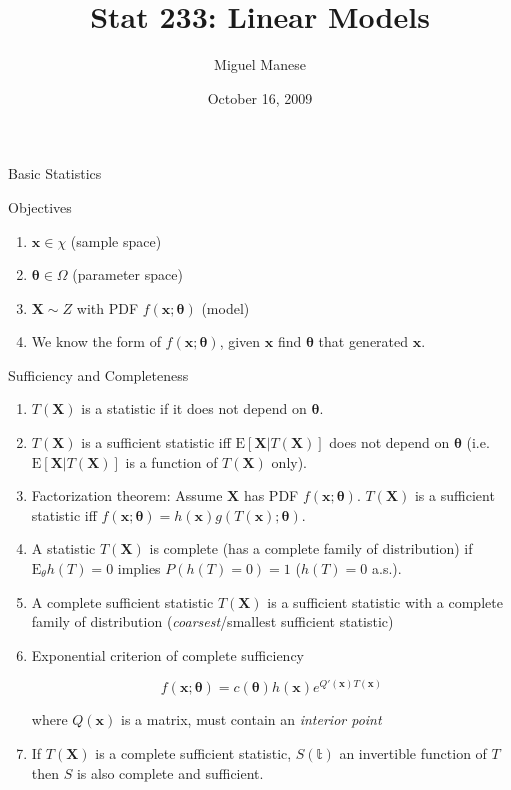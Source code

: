 \documentclass{article}
\title{Stat 233: Linear Models}
\author{Miguel Manese}
\date{October 16, 2009}
\newcommand{\E}{\mathrm{E}}
\newcommand{\bx}{\mathbf{x}}
\newcommand{\bX}{\mathbf{X}}
\newcommand{\TX}{T(\mathbf{X})}
\newcommand{\Tx}{T(\mathbf{x})}
\newcommand{\btheta}{\mathbf{\theta}}
\begin{document}
\maketitle

\begin{section}{Basic Statistics}
\begin{subsection}{Objectives}
\begin{enumerate}
\item $\mathbf{x} \in \chi$ (sample space)
\item $\mathbf{\theta} \in \Omega$ (parameter space)
\item $\mathbf{X} \sim Z$ with PDF $f(\mathbf{x};\mathbf{\theta})$ (model)
\item We know the form of $f(\bx;\btheta)$, given $\bx$ find $\btheta$
  that generated $\bx$.
\end{enumerate}
\end{subsection}

\begin{subsection}{Sufficiency and Completeness}
\begin{enumerate}
\item $T(\bX)$ is a statistic if it does not depend on $\btheta$.
\item $T(\bX)$ is a sufficient statistic iff $\E[\bX|T(\bX)]$ does not
  depend on $\btheta$ (i.e. $\E[\bX|T(\bX)]$ is a function of $T(\bX)$ only).
\item Factorization theorem: Assume $\bX$ has PDF $f(\bx;\btheta)$. 
  $T(\bX)$ is a sufficient statistic iff $f(\bx;\btheta) = 
  h(\bx) g(\Tx;\btheta)$.
\item A statistic $\TX$ is complete (has a complete family of distribution)
  if $\E_{\theta}h(T) = 0$ implies $P(h(T) = 0) = 1$ ($h(T) = 0$ a.s.).
\item A complete sufficient statistic $T(\bX)$ is a sufficient statistic
  with a complete family of distribution (\emph{coarsest}/smallest
  sufficient statistic)
\item Exponential criterion of complete sufficiency

\[ f(\bx; \btheta) = c(\btheta) h(\bx) e^{Q'(\bx) T(\bx)} \]

\noindent where $Q(\bx)$ is a matrix, must contain an \emph{interior point}
\item If $T(\bX)$ is a complete sufficient statistic, $S(\mathbb{t})$ an
  invertible function of $T$ then $S$ is also complete and sufficient.
\end{enumerate}
\end{subsection}


\end{section}
\end{document}
